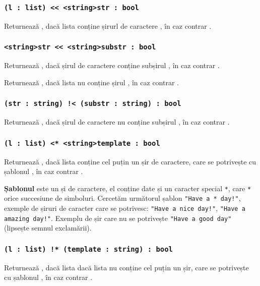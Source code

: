 \subsubsection{\lstinline|(l : list) << <string>str : bool|}

Returnează \true{}, dacă lista  conține șirurl de caractere , în caz contrar \false{}.

\subsubsection{\lstinline|<string>str << <string>substr : bool|}

Returnează \true{}, dacă șirul de caractere  conține subșirul , în caz contrar \false{}.

Returnează \true{}, dacă lista  nu conține șirul , în caz contrar \false{}.

\subsubsection{\lstinline|(str : string) !< (substr : string) : bool|}

Returnează \true{}, dacă șirul de caractere  nu conține subșirul , în caz contrar \false{}.

\subsubsection{\lstinline|(l : list) <* <string>template : bool|}

Returnează \true{}, dacă lista  conține cel puțin un șir de caractere, care se potrivește cu șablonul , în caz contrar \false{}.

{\bf Șablonul} este un și de caractere, el conține date și un caracter special \lstinline`*`, care \lstinline`*` orice succesiune de simboluri. Cercetăm următorul șablon \lstinline|"Have a * day!"|, exemple de șiruri de caracter care se potrivesc: \lstinline|"Have a nice day!"|, \lstinline|"Have a amazing day!"|. Exemplu de șir care nu se potrivește \lstinline|"Have a good day"| (lipsește semnul exclamării).

\subsubsection{\lstinline|(l : list) !* (template : string) : bool|}

Returnează \true{}, dacă lista  dacă lista nu conține cel puțin un șir, care se potrivește cu șablonul , în caz contrar \false{}.

